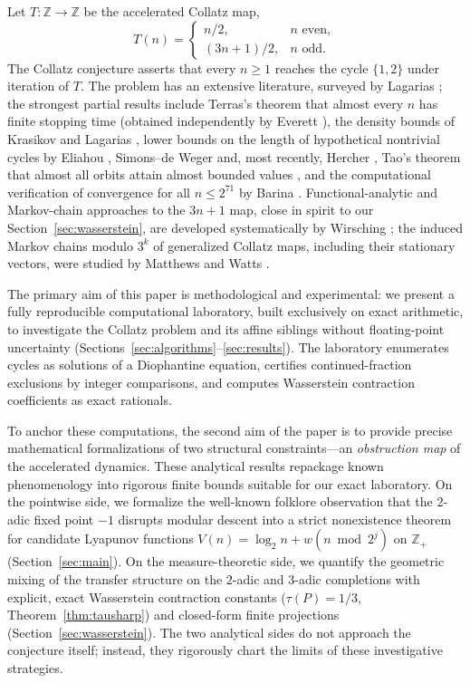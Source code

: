 \documentclass[11pt]{amsart}
\theoremstyle{definition}
\theoremstyle{remark}
\newcommand{\Z}{\mathbb{Z}}
\begin{document}
Let $T:\Z\to\Z$ be the accelerated Collatz map,
\[
T(n)=\begin{cases} n/2, & n \text{ even},\\ (3n+1)/2, & n \text{ odd}.\end{cases}
\]
The Collatz conjecture asserts that every $n\ge 1$ reaches the cycle $\{1,2\}$ under iteration of $T$. The problem has an extensive literature, surveyed by Lagarias \cite{lagarias1985,lagarias2010}; the strongest partial results include Terras's theorem that almost every $n$ has finite stopping time \cite{terras1976} (obtained independently by Everett \cite{everett1977}), the density bounds of Krasikov and Lagarias \cite{krasikovlagarias2003}, lower bounds on the length of hypothetical nontrivial cycles by Eliahou \cite{eliahou1993}, Simons--de Weger \cite{simonsdeweger2005} and, most recently, Hercher \cite{hercher2023}, Tao's theorem that almost all orbits attain almost bounded values \cite{tao2022}, and the computational verification of convergence for all $n\le 2^{71}$ by Barina \cite{barina2021,barina2025}. Functional-analytic and Markov-chain approaches to the $3n+1$ map, close in spirit to our Section~\ref{sec:wasserstein}, are developed systematically by Wirsching \cite{wirsching1998}; the induced Markov chains modulo $3^k$ of generalized Collatz maps, including their stationary vectors, were studied by Matthews and Watts \cite{matthewswatts1984,matthewswatts1985}.

The primary aim of this paper is methodological and experimental: we present a fully reproducible computational laboratory, built exclusively on exact arithmetic, to investigate the Collatz problem and its affine siblings without floating-point uncertainty (Sections~\ref{sec:algorithms}--\ref{sec:results}). The laboratory enumerates cycles as solutions of a Diophantine equation, certifies continued-fraction exclusions by integer comparisons, and computes Wasserstein contraction coefficients as exact rationals. 

To anchor these computations, the second aim of the paper is to provide precise mathematical formalizations of two structural constraints---an \emph{obstruction map} of the accelerated dynamics. These analytical results repackage known phenomenology into rigorous finite bounds suitable for our exact laboratory. On the pointwise side, we formalize the well-known folklore observation that the $2$-adic fixed point $-1$ disrupts modular descent \cite{terras1976,everett1977} into a strict nonexistence theorem for candidate Lyapunov functions $V(n)=\log_2 n+w(n\bmod 2^j)$ on $\Z_+$ (Section~\ref{sec:main}). On the measure-theoretic side, we quantify the geometric mixing of the transfer structure on the $2$-adic and $3$-adic completions with explicit, exact Wasserstein contraction constants ($\tau(P) = 1/3$, Theorem~\ref{thm:tausharp}) and closed-form finite projections (Section~\ref{sec:wasserstein}). The two analytical sides do not approach the conjecture itself; instead, they rigorously chart the limits of these investigative strategies.
\end{document}
